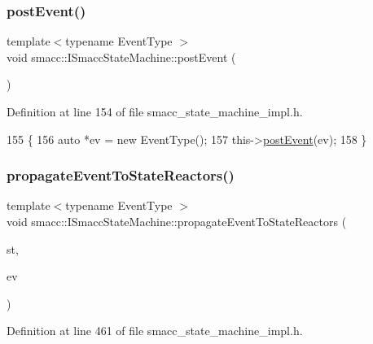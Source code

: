 \subsubsection{\texorpdfstring{post\+Event()}{postEvent()}\hspace{0.1cm}{\footnotesize\ttfamily [2/2]}}
{\footnotesize\ttfamily template$<$typename Event\+Type $>$ \\
void smacc\+::\+I\+Smacc\+State\+Machine\+::post\+Event (\begin{DoxyParamCaption}{ }\end{DoxyParamCaption})}



Definition at line 154 of file smacc\+\_\+state\+\_\+machine\+\_\+impl.\+h.


\begin{DoxyCode}
155 \{
156   \textcolor{keyword}{auto} *ev = \textcolor{keyword}{new} EventType();
157   this->\hyperlink{classsmacc_1_1ISmaccStateMachine_a1549189caf29520514e677ca46f57348}{postEvent}(ev);
158 \}
\end{DoxyCode}
\mbox{\label{classsmacc_1_1ISmaccStateMachine_a3d369c7cff22632ca85a8656000ba19c}} 
\subsubsection{\texorpdfstring{propagate\+Event\+To\+State\+Reactors()}{propagateEventToStateReactors()}}
{\footnotesize\ttfamily template$<$typename Event\+Type $>$ \\
void smacc\+::\+I\+Smacc\+State\+Machine\+::propagate\+Event\+To\+State\+Reactors (\begin{DoxyParamCaption}\item[{\hyperlink{classsmacc_1_1ISmaccState}{I\+Smacc\+State} $\ast$}]{st,  }\item[{Event\+Type $\ast$}]{ev }\end{DoxyParamCaption})\hspace{0.3cm}{\ttfamily [private]}}



Definition at line 461 of file smacc\+\_\+state\+\_\+machine\+\_\+impl.\+h.



